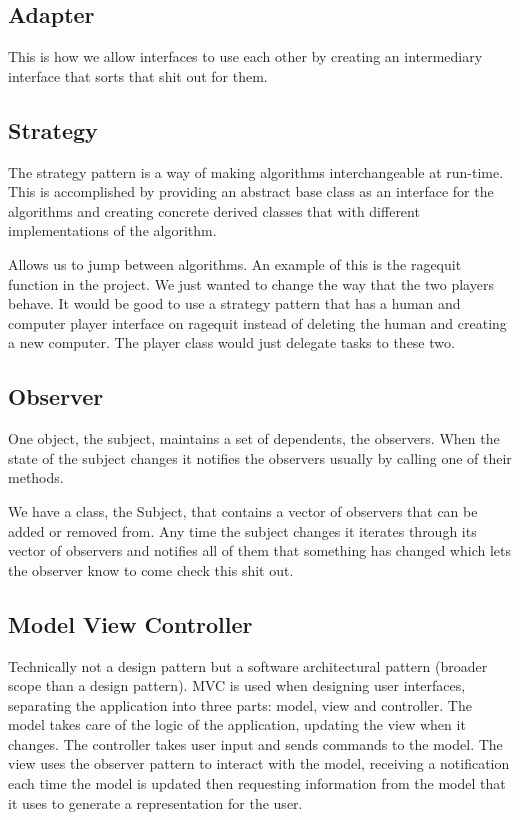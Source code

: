\documentclass[12pt]{article}
\begin{document}
\subsection*{Adapter}
This is how we allow interfaces to use each other by creating an intermediary interface that sorts that shit out for them.

\subsection*{Strategy}
The strategy pattern is a way of making algorithms interchangeable at run-time. This is accomplished by providing an abstract base class as an interface for the algorithms and creating concrete derived classes that with different implementations of the algorithm.

Allows us to jump between algorithms. An example of this is the ragequit function in the project. We just wanted to change the way that the two players behave. It would be good to use a strategy pattern that has a human and computer player interface on ragequit instead of deleting the human and creating a new computer. The player class would just delegate tasks to these two.

\subsection*{Observer}
One object, the subject, maintains a set of dependents, the observers. When the state of the subject changes it notifies the observers usually by calling one of their methods.

We have a class, the Subject, that contains a vector of observers that can be added or removed from. Any time the subject changes it iterates through its vector of observers and notifies all of them that something has changed which lets the observer know to come check this shit out.

\subsection*{Model View Controller}
Technically not a design pattern but a software architectural pattern (broader scope than a design pattern). MVC is used when designing user interfaces, separating the application into three parts: model, view and controller. The model takes care of the logic of the application, updating the view when it changes. The controller takes user input and sends commands to the model. The view uses the observer pattern to interact with the model, receiving a notification each time the model is updated then requesting information from the model that it uses to generate a representation for the user.
\end{document}
